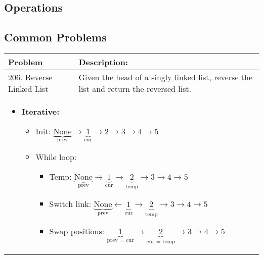 \subsection{Operations}
\newpage

\subsection{Common Problems}
\begin{summary}
    \begin{center}
        \begin{tabular}{ll}
            \toprule
            \textbf{Problem} & \textbf{Description:} \\
            \midrule
                206. Reverse Linked List & Given the head of a singly linked list, reverse the list and return the reversed list. \\
                \multicolumn{2}{p{\linewidth}}{
                    \begin{itemize}
                        \item \textbf{Iterative:} 
                        \begin{itemize}
                            \item Init: $\underbrace{\text{None}}_{\text{prev}} \rightarrow \underbrace{1}_{\text{cur}} \rightarrow 2 \rightarrow 3 \rightarrow 4 \rightarrow 5$
                            \item While loop: 
                            \begin{itemize}
                                \item Temp: $\underbrace{\text{None}}_{\text{prev}} \rightarrow \underbrace{1}_{\text{cur}} \rightarrow \underbrace{2}_{\text{temp}} \rightarrow 3 \rightarrow 4 \rightarrow 5$
                                \item Switch link: $\underbrace{\text{None}}_{\text{prev}} \leftarrow \underbrace{1}_{\text{cur}} \rightarrow \underbrace{2}_{\text{temp}} \rightarrow 3 \rightarrow 4 \rightarrow 5$
                                \item Swap positions: $\underbrace{1}_{\text{prev = cur}} \rightarrow \underbrace{2}_{\text{cur = temp}} \rightarrow 3 \rightarrow 4 \rightarrow 5$
                            \end{itemize}
                        \end{itemize}                        
                    \end{itemize}
                } \\

\end{tabular}
\end{center}
\end{summary}
